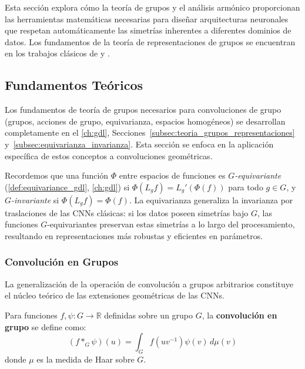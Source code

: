 Esta sección explora cómo la teoría de grupos y el análisis armónico proporcionan las herramientas matemáticas necesarias para diseñar arquitecturas neuronales que respetan automáticamente las simetrías inherentes a diferentes dominios de datos. Los fundamentos de la teoría de representaciones de grupos se encuentran en los trabajos clásicos de \citet{Peter1927} y \citet{Serre1977}.

\subsection{Fundamentos Teóricos}\label{subsec:fundamentos_teoricos}

Los fundamentos de teoría de grupos necesarios para convoluciones de grupo (grupos, acciones de grupo, equivarianza, espacios homogéneos) se desarrollan completamente en el \autoref{ch:gdl}, Secciones~\ref{subsec:teoria_grupos_representaciones} y~\ref{subsec:equivarianza_invarianza}. Esta sección se enfoca en la aplicación específica de estos conceptos a convoluciones geométricas.

Recordemos que una función $\Phi$ entre espacios de funciones es \textit{$G$-equivariante} (\autoref{def:equivariance_gdl}, \autoref{ch:gdl}) si $\Phi(L_g f) = L_g' (\Phi(f))$ para todo $g \in G$, y \textit{$G$-invariante} si $\Phi(L_g f) = \Phi(f)$. La equivarianza generaliza la invarianza por traslaciones de las \glspl{CNN} clásicas: si los datos poseen simetrías bajo $G$, las funciones $G$-equivariantes preservan estas simetrías a lo largo del procesamiento, resultando en representaciones más robustas y eficientes en parámetros.

\subsubsection{Convolución en Grupos}

La generalización de la operación de convolución a grupos arbitrarios constituye el núcleo teórico de las extensiones geométricas de las \glspl{CNN}.

\begin{definition}
Para funciones $f, \psi: G \to \mathbb{R}$ definidas sobre un grupo $G$, la \textbf{convolución en grupo} se define como:
\begin{equation}
(f *_G \psi)(u) = \int_G f(uv^{-1}) \psi(v) \, d\mu(v)
\label{eq:group_convolution}
\end{equation}
donde $\mu$ es la medida de Haar sobre $G$.
\end{definition}

